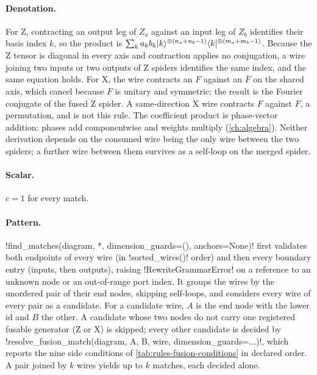 \paragraph{Denotation.} For Z, contracting an output leg of $Z_a$ against an input leg of $Z_b$ identifies their basis index $k$, so the product is $\sum_k a_kb_k\lvert k \rangle^{\otimes(n_a+n_b-1)}\langle k \rvert^{\otimes(m_a+m_b-1)}$. Because the Z tensor is diagonal in every axis and contraction applies no conjugation, a wire joining two inputs or two outputs of Z spiders identifies the same index, and the same equation holds. For X, the wire contracts an $F$ against an $\overline{F}$ on the shared axis, which cancel because $F$ is unitary and symmetric; the result is the Fourier conjugate of the fused Z spider. A same-direction X wire contracts $F$ against $F$, a permutation, and is not this rule. The coefficient product is phase-vector addition: phases add componentwise and weights multiply (\cref{ch:algebra}). Neither derivation depends on the consumed wire being the only wire between the two spiders; a further wire between them survives as a self-loop on the merged spider.

\paragraph{Scalar.} $c=1$ for every match.

\paragraph{Pattern.} \py!find_matches(diagram, *, dimension_guards=(), anchors=None)! first validates both endpoints of every wire (in \py!sorted_wires()! order) and then every boundary entry (inputs, then outputs), raising \py!RewriteGrammarError! on a reference to an unknown node or an out-of-range port index. It groups the wires by the unordered pair of their end nodes, skipping self-loops, and considers every wire of every pair as a candidate. For a candidate wire, $A$ is the end node with the lower id and $B$ the other. A candidate whose two nodes do not carry one registered fusable generator (Z or X) is skipped; every other candidate is decided by \py!resolve_fusion_match(diagram, A, B, wire, dimension_guards=...)!, which reports the nine side conditions of \cref{tab:rules-fusion-conditions} in declared order. A pair joined by $k$ wires yields up to $k$ matches, each decided alone.

